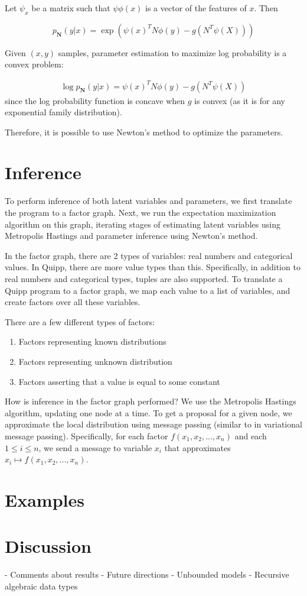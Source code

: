 \documentclass[proceed]{article}
\begin{document}
    Let $\psi_x$ be a matrix such that $\psi \phi(x)$ is a vector of the
    features of $x$.  Then

    $$p_{\mathbf{N}}(y | x) = \exp(\psi(x)^T N \phi(y) - g(N^T \psi(X)))$$

    Given $(x, y)$ samples, parameter estimation to maximize log probability is a convex
    problem:

    \begin{align*}
      \log p_{\mathbf{N}}(y | x) = \psi(x)^T N \phi(y) - g(N^T \psi(X))
    \end{align*}
    since the log probability function is concave when $g$ is convex (as it is
    for any exponential family distribution).

    Therefore, it is possible to use Newton's method to optimize the parameters.

  \section{Inference}

    To perform inference of both latent variables and parameters, we first
    translate the program to a factor graph.  Next, we run the
    expectation maximization algorithm on this graph, iterating stages of
    estimating latent variables using Metropolis Hastings and parameter
    inference using Newton's method.

    In the factor graph, there are 2 types of variables: real numbers
    and categorical values.
    In Quipp, there are more value types than this.  Specifically,
    in addition to real numbers and categorical types, tuples
    are also supported.
    To translate a Quipp program to a factor graph, we
    map each value to a list of variables, and create factors
    over all these variables.

    There are a few different types of factors:
    \begin{enumerate}
      \item Factors representing known distributions
      \item Factors representing unknown distribution
      \item Factors asserting that a value is equal to some constant
    \end{enumerate}

    How is inference in the factor graph performed?  We use the Metropolis Hastings
    algorithm, updating one node at a time.  To get a proposal for a given node,
    we approximate the local distribution using message passing (similar to
    in variational message passing).  Specifically, for each factor
    $f(x_1, x_2, ..., x_n)$ and each $1 \leq i \leq n$, we send a message
    to variable $x_i$ that approximates $x_i \mapsto f(x_1, x_2, ..., x_n)$.



  \section{Examples}

  \section{Discussion}

  - Comments about results
  - Future directions
    - Unbounded models
    - Recursive algebraic data types
\end{document}
